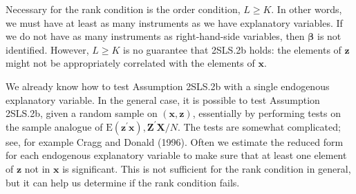 \documentclass[10pt]{article}
\begin{document}
Necessary for the rank condition is the order condition, $L \geq K$. In other words, we must have at least as many instruments as we have explanatory variables. If we do not have as many instruments as right-hand-side variables, then $\boldsymbol{\beta}$ is not identified. However, $L \geq K$ is no guarantee that 2SLS.2b holds: the elements of $\mathbf{z}$ might not be appropriately correlated with the elements of $\mathbf{x}$.

We already know how to test Assumption 2SLS.2b with a single endogenous explanatory variable. In the general case, it is possible to test Assumption 2SLS.2b, given a random sample on $(\mathbf{x}, \mathbf{z})$, essentially by performing tests on the sample analogue of $\mathrm{E}\left(\mathbf{z}^{\prime} \mathbf{x}\right), \mathbf{Z}^{\prime} \mathbf{X} / N$. The tests are somewhat complicated; see, for example Cragg and Donald (1996). Often we estimate the reduced form for each endogenous explanatory variable to make sure that at least one element of $\mathbf{z}$ not in $\mathbf{x}$ is significant. This is not sufficient for the rank condition in general, but it can help us determine if the rank condition fails.
\end{document}
